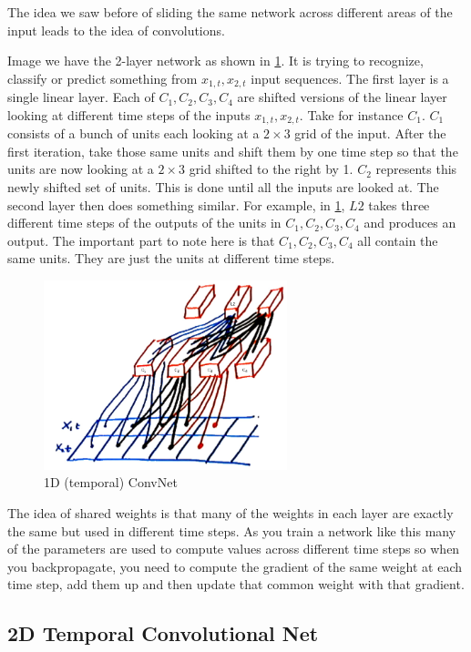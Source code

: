 The idea we saw before of sliding the same network across different areas of the input leads to the idea of convolutions. 

Image we have the 2-layer network as shown in \cref{fig:2layer}. 
It is trying to recognize, classify or predict something from $x_{1,t}, x_{2,t}$ input sequences. 
The first layer is a single linear layer. 
Each of $C_{1}, C_{2}, C_{3}, C_{4}$ are shifted versions of the linear layer looking at different time steps of the inputs $x_{1,t}, x_{2,t}$. 
Take for instance $C_{1}$.
$C_{1}$ consists of a bunch of units each looking at a $2\times 3$ grid of the input.
After the first iteration, take those same units and shift them by one time step so that the units are now looking at a $2\times 3$ grid shifted to the right by 1.
$C_{2}$ represents this newly shifted set of units.
This is done until all the inputs are looked at.
The second layer then does something similar.
For example, in \cref{fig:2layer}, $L2$ takes three different time steps of the outputs of the units in $C_{1}, C_{2}, C_{3}, C_{4}$ and produces an output.
The important part to note here is that $C_{1}, C_{2}, C_{3}, C_{4}$ all contain the same units.
They are just the units at different time steps.

\begin{figure}
    \centering
    \includegraphics[width=200pt]{lectures/03-a/images/conv_net.png}
    \caption{1D (temporal) ConvNet}
    \label{fig:2layer}
\end{figure}

The idea of shared weights is that many of the weights in each layer are exactly the same but used in different time steps. 
As you train a network like this many of the parameters are used to compute values across different time steps so when you backpropagate, you need to compute the gradient of the same weight at each time step, add them up and then update that common weight with that gradient.

\subsection{2D Temporal Convolutional Net}

